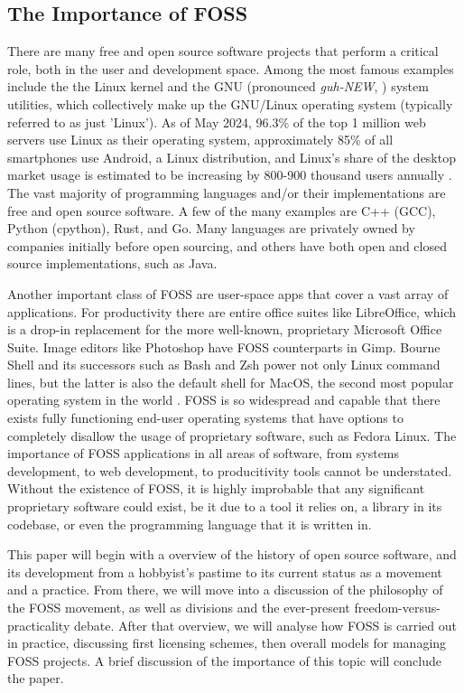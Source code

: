 \documentclass[manuscript,screen,nonacm,12pt]{acmart}
\begin{document}
\subsection{The Importance of FOSS}
\label{sec:importance}
There are many free and open source software projects that perform a critical
role, both in the user and development space. Among the most famous examples
include the the Linux kernel and the GNU (pronounced \textit{guh-NEW},
) system utilities, which collectively make up the
GNU/Linux operating system (typically referred to as just 'Linux'). As of May
2024, 96.3\% of the top 1 million web servers use Linux as their operating
system, approximately 85\% of all smartphones use Android, a Linux distribution,
and Linux's share of the desktop market usage is estimated to be increasing by
800-900 thousand users annually \cite{elad2024}. The vast majority of
programming languages and/or their implementations are free and open source
software. A few of the many examples are C++ (GCC), Python (cpython), Rust, and
Go. Many languages are privately owned by companies initially before open
sourcing, and others have both open and closed source implementations, such as
Java.

Another important class of FOSS are user-space apps that cover a vast array of
applications. For productivity there are entire office suites like LibreOffice,
which is a drop-in replacement for the more well-known, proprietary Microsoft
Office Suite. Image editors like Photoshop have FOSS counterparts in Gimp.
Bourne Shell and its successors such as Bash and Zsh power not only Linux
command lines, but the latter is also the default shell for MacOS, the second
most popular operating system in the world \cite{elad2024}. FOSS is so
widespread and capable that there exists fully functioning end-user operating
systems that have options to completely disallow the usage of proprietary
software, such as Fedora Linux. The importance of FOSS applications in all areas
of software, from systems development, to web development, to producitivity
tools cannot be understated. Without the existence of FOSS, it is highly
improbable that any significant proprietary software could exist, be it due to a
tool it relies on, a library in its codebase, or even the programming language
that it is written in.

This paper will begin with a overview of the history of open source software,
and its development from a hobbyist's pastime to its current status as a
movement and a practice. From there, we will move into a discussion of the
philosophy of the FOSS movement, as well as divisions and the ever-present
freedom-versus-practicality debate. After that overview, we will analyse how
FOSS is carried out in practice, discussing first licensing schemes, then
overall models for managing FOSS projects. A brief discussion of the importance
of this topic will conclude the paper.
\end{document}
